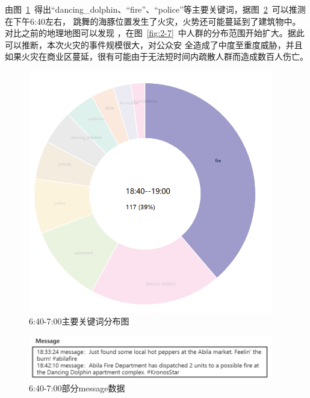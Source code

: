 \documentclass[a4paper]{article}
\begin{document}
由图~\ref{fig:2-5}~得出“dancing\_dolphin、“fire”、“police”等主要关键词，据图~\ref{fig:2-6}~可以推测在下午6:40左右，
跳舞的海豚位置发生了火灾，火势还可能蔓延到了建筑物中。对比之前的地理地图可以发现
，在图~\ref{fig:2-7}~中人群的分布范围开始扩大。据此可以推断，本次火灾的事件规模很大，对公众安
全造成了中度至重度威胁，并且如果火灾在商业区蔓延，很有可能由于无法短时间内疏散人群而造成数百人伤亡。
\begin{figure}[H]
  \centering
  \includegraphics[width=0.95\textwidth]{images/2-5.png}
  \caption{6:40-7:00主要关键词分布图}\label{fig:2-5}
  \vspace{\baselineskip}
\end{figure}

\begin{figure}[H]
  \centering
  \includegraphics[width=0.95\textwidth]{images/2-6.png}
  \caption{6:40-7:00部分message数据}\label{fig:2-6}
  \vspace{\baselineskip}
\end{figure}
\end{document}
